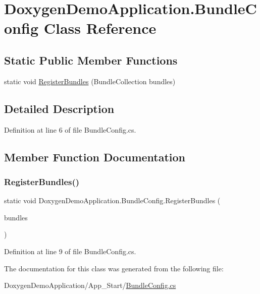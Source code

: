 \hypertarget{class_doxygen_demo_application_1_1_bundle_config}{}\section{Doxygen\+Demo\+Application.\+Bundle\+Config Class Reference}
\label{class_doxygen_demo_application_1_1_bundle_config}
\subsection*{Static Public Member Functions}
\begin{DoxyCompactItemize}
\item 
static void \mbox{\hyperlink{class_doxygen_demo_application_1_1_bundle_config_aaf64b5e04c989cfd414fc1c2b4e05981}{Register\+Bundles}} (Bundle\+Collection bundles)
\end{DoxyCompactItemize}


\subsection{Detailed Description}


Definition at line 6 of file Bundle\+Config.\+cs.



\subsection{Member Function Documentation}
\mbox{\label{class_doxygen_demo_application_1_1_bundle_config_aaf64b5e04c989cfd414fc1c2b4e05981}} 
\subsubsection{\texorpdfstring{Register\+Bundles()}{RegisterBundles()}}
{\footnotesize\ttfamily static void Doxygen\+Demo\+Application.\+Bundle\+Config.\+Register\+Bundles (\begin{DoxyParamCaption}\item[{Bundle\+Collection}]{bundles }\end{DoxyParamCaption})\hspace{0.3cm}{\ttfamily [static]}}



Definition at line 9 of file Bundle\+Config.\+cs.



The documentation for this class was generated from the following file\+:\begin{DoxyCompactItemize}
\item 
Doxygen\+Demo\+Application/\+App\+\_\+\+Start/\mbox{\hyperlink{_bundle_config_8cs}{Bundle\+Config.\+cs}}\end{DoxyCompactItemize}
